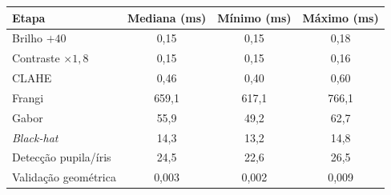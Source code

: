 \begin{tabular}{lccc}
\toprule
Etapa & Mediana (ms) & Mínimo (ms) & Máximo (ms) \\
\midrule
Brilho $+40$ & 0,15 & 0,15 & 0,18 \\
Contraste $\times1{,}8$ & 0,15 & 0,15 & 0,16 \\
CLAHE & 0,46 & 0,40 & 0,60 \\
Frangi & 659,1 & 617,1 & 766,1 \\
Gabor & 55,9 & 49,2 & 62,7 \\
\textit{Black-hat} & 14,3 & 13,2 & 14,8 \\
\midrule
Detecção pupila/íris & 24,5 & 22,6 & 26,5 \\
Validação geométrica & 0,003 & 0,002 & 0,009 \\
\bottomrule
\end{tabular}
